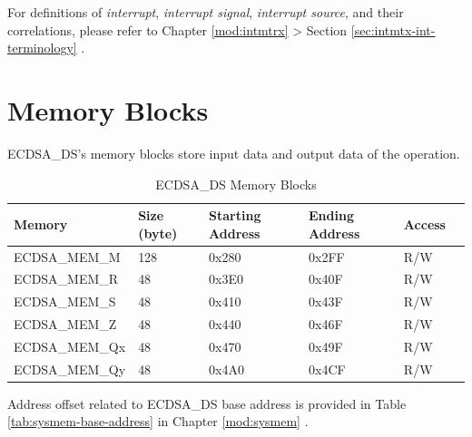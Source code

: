 \documentclass[main\_\_EN.tex]{subfiles}
\begin{document}
\begin{tiplisting}
For definitions of \textit{interrupt}, \textit{interrupt signal}, \textit{interrupt source}, and their correlations, please refer to Chapter \ref{mod:intmtrx} \textit{} > Section \ref{sec:intmtx-int-terminology} \textit{}.
\end{tiplisting}

\newpage
\section{Memory Blocks}

ECDSA\_DS's memory blocks store input data and output data of the operation.

\begin{table}[H]
    \centering
    \caption{ECDSA\_DS Memory Blocks} \label{tab:ecdsa-memory}
    \begin{threeparttable}
    \begin{tabular}{ | l | l | l | l | l | l | }
    \hline
        \rowcolor{lightgray}
        \textbf{Memory} & \textbf{Size (byte)}  &  \textbf{Starting Address}\tnote{*} &  \textbf{Ending Address} \tnote{*} & \textbf{Access}   \\ \hline
        ECDSA\_MEM\_M    & 128  & 0x280 & 0x2FF & R/W \\ \hline
        ECDSA\_MEM\_R    & 48   & 0x3E0 & 0x40F & R/W \\ \hline
        ECDSA\_MEM\_S    & 48   & 0x410 & 0x43F & R/W \\ \hline
        ECDSA\_MEM\_Z    & 48   & 0x440 & 0x46F & R/W \\ \hline
        ECDSA\_MEM\_Qx   & 48   & 0x470 & 0x49F & R/W \\ \hline
        ECDSA\_MEM\_Qy   & 48   & 0x4A0 & 0x4CF & R/W \\ \hline
    \end{tabular}
    \begin{tablenotes}
        \item[*] Address offset related to ECDSA\_DS base address is provided in Table \ref{tab:sysmem-base-address} in Chapter \ref{mod:sysmem} \textit{}.
    \end{tablenotes}
    \end{threeparttable}
\end{table}


\end{document}
